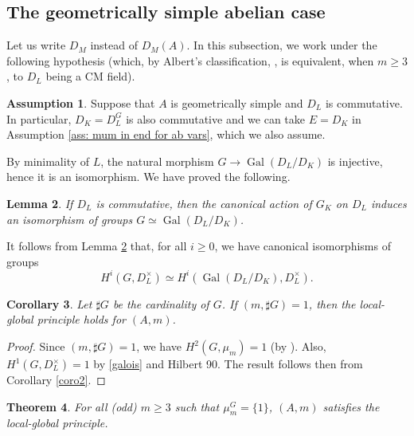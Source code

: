 \documentclass[a4paper,10pt]{amsart}
\theoremstyle{plain}
\newtheorem{theorem}{Theorem}[section]
\newtheorem{corollary}[theorem]{Corollary}
\newtheorem{lemma}[theorem]{Lemma}
\theoremstyle{definition}
\newtheorem{assumption}[theorem]{Assumption}
\theoremstyle{remark}
\newcommand{\bD}{D_L}
\DeclareMathOperator{\Gal}{Gal}
\begin{document}
\subsection{The geometrically simple abelian case} \label{sec: simp CM}

\label{sec: commutative simple} Let us write \(D_M\) instead of \(D_M(A)\). In this subsection, we work under the following hypothesis (which, by Albert's classification, \cite[Theorem 2, Chapter IV.21]{av}, is equivalent, when \(m\geq 3\), to \(\bD\) being a CM field). 

\begin{assumption}\label{ass2}
    Suppose that \(A\) is geometrically simple and \(\bD\) is commutative. In particular, \(D_K = \bD^G\) is also commutative and we can take \(E = D_K\) in Assumption \ref{ass: mum in end for ab vars}, which we also assume.
\end{assumption}
By minimality of \(L\), the natural morphism \(G \longrightarrow \Gal(\bD/D_K)\) is injective, hence it is an isomorphism. We have proved the following.

\begin{lemma}\label{lemmaCM} If \(\bD\) is commutative, then the canonical action of \(G_K\) on \(\bD\) induces an isomorphism of groups \(G \simeq \Gal(\bD/D_K)\). 
\end{lemma}



It follows from Lemma \ref{lemmaCM} that, for all \(i\geq 0\), we have canonical isomorphisms of groups 
\begin{equation}\label{galois}
H^i(G,\bD^\times)\simeq H^i(\Gal(\bD/D_K),\bD^\times).\end{equation}


\begin{corollary}\label{coroarith} Let \(\sharp G\) be the cardinality of \(G\). If \((m,\sharp G)=1\), then the local-global principle holds for \((A,m)\).      
\end{corollary}

\begin{proof} Since \((m, \sharp G)=1\), we have \(H^2(G,\mu_m) = 1\) (by \cite[Corollary 1, p.\ 105]{CF}). 
Also, \(H^1(G,\bD^\times) = 1\) by \eqref{galois} and Hilbert 90. The result follows then from Corollary \ref{coro2}. 
\end{proof}


\begin{theorem}\label{thm: main_Gal}
For all (odd) \(m \ge 3\) such that \(\mu_m^G = \{1\}\), \((A,m)\) satisfies the local-global principle.    
\end{theorem}
\end{document}

